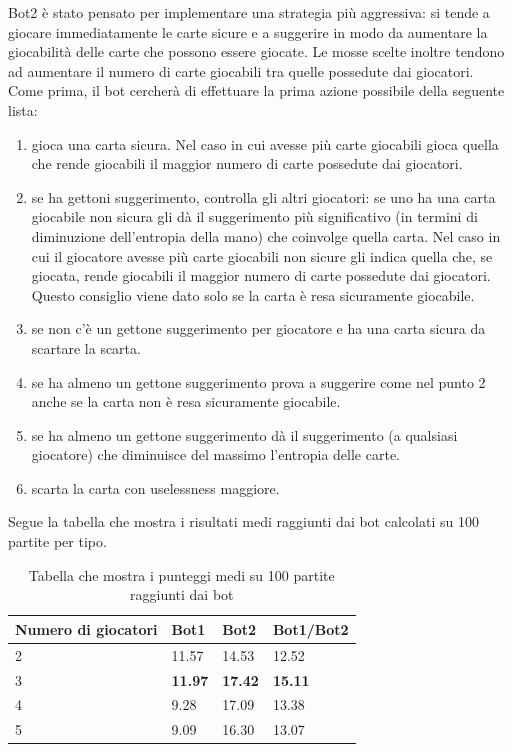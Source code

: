 \documentclass{article}
\begin{document}
\begin{flushleft}
Bot2 è stato pensato per implementare una strategia più aggressiva: si tende a giocare immediatamente le carte sicure e a suggerire in modo da aumentare la giocabilità delle carte che possono essere giocate. Le mosse scelte inoltre tendono ad aumentare il numero di carte giocabili tra quelle possedute dai giocatori. Come prima, il bot cercherà di effettuare la prima azione possibile della seguente lista:
\begin{enumerate}
    \item  gioca una carta sicura. Nel caso in cui avesse più carte giocabili gioca quella che rende giocabili il maggior numero di carte possedute dai giocatori.
    \item se ha gettoni suggerimento, controlla gli altri giocatori: se uno ha una carta giocabile non sicura gli dà il suggerimento più significativo (in termini di diminuzione dell'entropia della mano) che coinvolge quella carta. Nel caso in cui il giocatore avesse più carte giocabili non sicure gli indica quella che, se giocata, rende giocabili il maggior numero di carte possedute dai giocatori.
    Questo consiglio viene dato solo se la carta è resa sicuramente giocabile.
    \item se non c'è un gettone suggerimento per giocatore e ha una carta sicura da scartare la scarta.
  \item se ha almeno un gettone suggerimento prova a suggerire come nel punto 2 anche se la carta non è resa sicuramente giocabile.
  \item se ha almeno un gettone suggerimento dà il suggerimento (a qualsiasi giocatore) che diminuisce del massimo l'entropia delle carte.
    \item scarta la carta con uselessness maggiore.
\end{enumerate}
Segue la tabella che mostra i risultati medi raggiunti dai bot calcolati su 100 partite per tipo.
\end{flushleft}
\begin{table}[h]
    \centering
    \begin{tabular}{m|b|b|b}
        \toprule
        \textbf{Numero di giocatori} & \textbf{Bot1} & \textbf{Bot2} & \textbf{Bot1/Bot2} \\
        \midrule
        2 & 11.57 & 14.53 & 12.52 \\
        3 & \textbf{11.97} & \textbf{17.42} & \textbf{15.11} \\
        4 & 9.28 & 17.09 & 13.38\\
        5 & 9.09 & 16.30 & 13.07 \\
    \end{tabular}
    \caption{Tabella che mostra i punteggi medi su 100 partite raggiunti dai bot}
\end{table}
\end{document}
